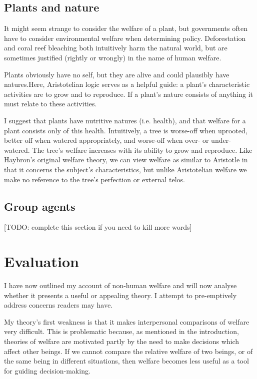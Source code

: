 \documentclass{article}
\begin{document}
\subsection{Plants and nature}

It might seem strange to consider the welfare of a plant, but governments often have to consider environmental welfare when determining policy. Deforestation and coral reef bleaching both intuitively harm the natural world, but are sometimes justified (rightly or wrongly) in the name of human welfare. 

Plants obviously have no self, but they are alive and could plausibly have natures.Here, Aristotelian logic serves as a helpful guide: a plant's characteristic activities are to grow and to reproduce. If a plant's nature consists of anything it must relate to these activities. 

I suggest that plants have nutritive natures (i.e. health), and that welfare for a plant consists only of this health. Intuitively, a tree is worse-off when uprooted, better off when watered appropriately, and worse-off when over- or under-watered. The tree's welfare increases with its ability to grow and reproduce. Like Haybron's original welfare theory, we can view welfare as similar to Aristotle in that it concerns the subject's characteristics, but unlike Aristotelian welfare we make no reference to the tree's perfection or external telos.

\subsection{Group agents}

[TODO: complete this section if you need to kill more words]

\section{Evaluation}

I have now outlined my account of non-human welfare and will now analyse whether it presents a useful or appealing theory. I attempt to pre-emptively address concerns readers may have.

My theory's first weakness is that it makes interpersonal comparisons of welfare very difficult. This is problematic because, as mentioned in the introduction, theories of welfare are motivated partly by the need to make decisions which affect other beings. If we cannot compare the relative welfare of two beings, or of the same being in different situations, then welfare becomes less useful as a tool for guiding decision-making.
\end{document}
